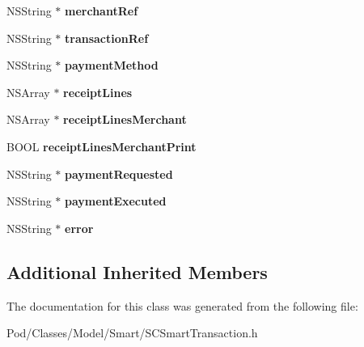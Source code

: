 \begin{DoxyCompactItemize}
\item 
N\+S\+String $\ast$ {\bfseries merchant\+Ref}\hypertarget{interface_s_c_smart_transaction_a0c49c2ef51ad0b1f486c196071edb062}{}\label{interface_s_c_smart_transaction_a0c49c2ef51ad0b1f486c196071edb062}

\item 
N\+S\+String $\ast$ {\bfseries transaction\+Ref}\hypertarget{interface_s_c_smart_transaction_ab8ca2cfdd6243fae96b2fa4dc5f1231c}{}\label{interface_s_c_smart_transaction_ab8ca2cfdd6243fae96b2fa4dc5f1231c}

\item 
N\+S\+String $\ast$ {\bfseries payment\+Method}\hypertarget{interface_s_c_smart_transaction_a881d7ece3e59a1680aff38899fe90612}{}\label{interface_s_c_smart_transaction_a881d7ece3e59a1680aff38899fe90612}

\item 
N\+S\+Array $\ast$ {\bfseries receipt\+Lines}\hypertarget{interface_s_c_smart_transaction_a840a7cd55586d44278e6d7e6de8dc35e}{}\label{interface_s_c_smart_transaction_a840a7cd55586d44278e6d7e6de8dc35e}

\item 
N\+S\+Array $\ast$ {\bfseries receipt\+Lines\+Merchant}\hypertarget{interface_s_c_smart_transaction_aa21dbd08a4626507089bd89a3917b97e}{}\label{interface_s_c_smart_transaction_aa21dbd08a4626507089bd89a3917b97e}

\item 
B\+O\+OL {\bfseries receipt\+Lines\+Merchant\+Print}\hypertarget{interface_s_c_smart_transaction_a7ff28c0f001d2b1b2f3ac56b4fd0f89f}{}\label{interface_s_c_smart_transaction_a7ff28c0f001d2b1b2f3ac56b4fd0f89f}

\item 
N\+S\+String $\ast$ {\bfseries payment\+Requested}\hypertarget{interface_s_c_smart_transaction_a482c524396acb1522e7add383baec02a}{}\label{interface_s_c_smart_transaction_a482c524396acb1522e7add383baec02a}

\item 
N\+S\+String $\ast$ {\bfseries payment\+Executed}\hypertarget{interface_s_c_smart_transaction_a2dad961f9cd8720fc64d9d4f857ce74c}{}\label{interface_s_c_smart_transaction_a2dad961f9cd8720fc64d9d4f857ce74c}

\item 
N\+S\+String $\ast$ {\bfseries error}\hypertarget{interface_s_c_smart_transaction_ab3b3490bbeb4863410c5be688613f140}{}\label{interface_s_c_smart_transaction_ab3b3490bbeb4863410c5be688613f140}

\end{DoxyCompactItemize}
\subsection*{Additional Inherited Members}


The documentation for this class was generated from the following file\+:\begin{DoxyCompactItemize}
\item 
Pod/\+Classes/\+Model/\+Smart/S\+C\+Smart\+Transaction.\+h\end{DoxyCompactItemize}
